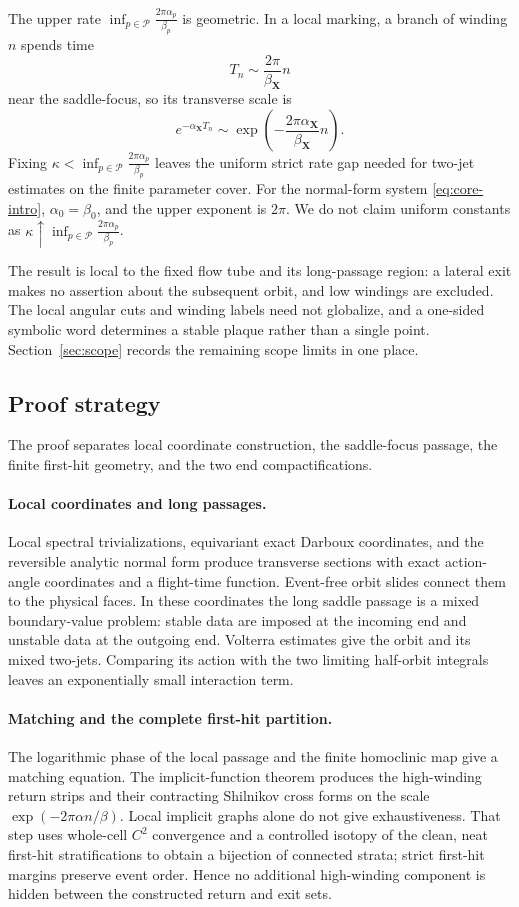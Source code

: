 \documentclass[11pt]{amsart}
\numberwithin{equation}{section}
\theoremstyle{definition}
\theoremstyle{remark}
\begin{document}
The upper rate
$\inf_{p\in\mathcal P}\frac{2\pi\alpha_p}{\beta_p}$ is geometric.  In a local
marking, a branch of
winding $n$ spends time
\[
 T_n\sim\frac{2\pi}{\beta_{\mathbf X}}n
\]
near the saddle-focus, so its transverse scale is
\[
 e^{-\alpha_{\mathbf X}T_n}
 \sim\exp\left(-\frac{2\pi\alpha_{\mathbf X}}
                    {\beta_{\mathbf X}}n\right).
\]
Fixing
$\kappa<\inf_{p\in\mathcal P}\frac{2\pi\alpha_p}{\beta_p}$ leaves the uniform strict rate
gap needed for two-jet estimates on the finite parameter cover.  For the
normal-form system \eqref{eq:core-intro}, $\alpha_0=\beta_0$, and the
upper exponent is $2\pi$.  We do not claim uniform constants as
$\kappa\uparrow
 \inf_{p\in\mathcal P}\frac{2\pi\alpha_p}{\beta_p}$.

The result is local to the fixed flow tube and its long-passage region: a
lateral exit makes no assertion about the subsequent orbit, and low
windings are excluded.  The local angular cuts and winding labels need not
globalize, and a one-sided symbolic word determines a stable plaque rather
than a single point.  Section~\ref{sec:scope} records the remaining scope
limits in one place.

\subsection{Proof strategy}

The proof separates local coordinate construction, the saddle-focus
passage, the finite first-hit geometry, and the two end compactifications.

\paragraph{Local coordinates and long passages.}
Local spectral trivializations, equivariant exact Darboux coordinates, and
the reversible analytic normal form produce transverse sections with exact
action-angle coordinates and a flight-time function.  Event-free orbit
slides connect them to the physical faces.  In these coordinates the long
saddle passage is a mixed boundary-value problem: stable data are imposed
at the incoming end and unstable data at the outgoing end.  Volterra
estimates give the orbit and its mixed two-jets.  Comparing its action with
the two limiting half-orbit integrals leaves an exponentially small
interaction term.

\paragraph{Matching and the complete first-hit partition.}
The logarithmic phase of the local passage and the finite homoclinic map
give a matching equation.  The implicit-function theorem produces the
high-winding return strips and their contracting Shilnikov cross forms on
the scale $\exp(-2\pi\alpha n/\beta)$.  Local implicit graphs alone do not
give exhaustiveness.  That step uses whole-cell $C^2$ convergence and a
controlled isotopy of the clean, neat first-hit stratifications to obtain a
bijection of connected strata; strict first-hit margins preserve event
order.  Hence no additional high-winding component is hidden between the
constructed return and exit sets.
\end{document}
